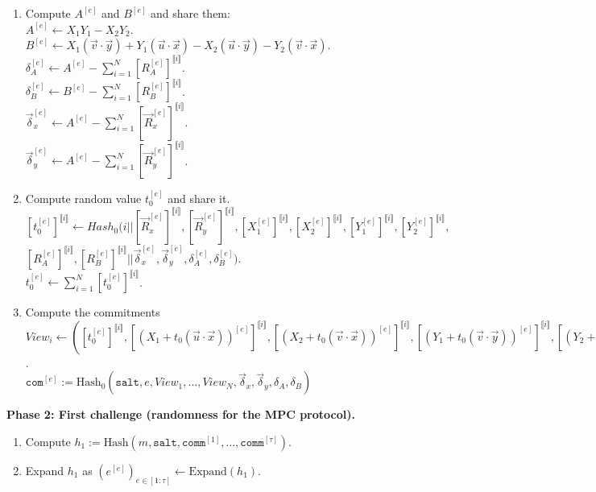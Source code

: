 \documentclass[english]{article}
\newcommand{\lir}{\llbracket i \rrbracket}
\begin{document}
\begin{tcolorbox}[title=Protocol 15: Signing Algorithm, breakable, enhanced, colback=white, colframe=black]
\begin{enumerate}[label=\arabic*.]
				\item Compute $A^{[e]}$ and $B^{[e]}$ and share them: \\
				\quad $A^{[e]} \leftarrow X_1Y_1 - X_2Y_2$. \\
				\quad $B^{[e]} \leftarrow X_1(\vec{v} \cdot \vec{y}) + Y_1(\vec{u} \cdot \vec{x}) - X_2(\vec{u} \cdot \vec{y}) - Y_2(\vec{v} \cdot \vec{x})$. \\
				\quad $\delta_A^{[e]} \leftarrow A^{[e]} - \sum_{i=1}^{N} [R_A^{[e]}]^{\lir}$. \\
				\quad $\delta_B^{[e]} \leftarrow B^{[e]} - \sum_{i=1}^{N} [R_B^{[e]}]^{\lir}$. \\
				\quad $\vec{\delta}_x^{[e]} \leftarrow A^{[e]} - \sum_{i=1}^{N} [\vec{R}_x^{[e]}]^{\lir}$. \\
				\quad $\vec{\delta}_y^{[e]} \leftarrow A^{[e]} - \sum_{i=1}^{N} [\vec{R}_y^{[e]}]^{\lir}$.
				
				\item Compute random value $t_0^{[e]}$ and share it. \\
				\quad $[t_0^{[e]}]^{\lir} \leftarrow Hash_0(i || [\vec{R}_x^{[e]}]^{\lir}, [\vec{R}_y^{[e]}]^{\lir}, [X_1^{[e]}]^{\lir}, [X_2^{[e]}]^{\lir}, [Y_1^{[e]}]^{\lir}, [Y_2^{[e]}]^{\lir},$ \\ $[R_A^{[e]}]^{\lir}, [R_B^{[e]}]^{\lir} || \vec{\delta}_x^{[e]}, \vec{\delta}_y^{[e]}, \delta_A^{[e]}, \delta_B^{[e]})$. \\
				\quad $t_0^{[e]} \leftarrow \sum_{i=1}^{N} [t_0^{[e]}]^{\lir}$.
				
				
				\item Compute the commitments \\
				\quad $View_i \leftarrow (
				[t_0^{[e]}]^{\lir},
				[(X_1 + t_0(\vec{u} \cdot \vec{x}))^{[e]}]^{\lir},
				[(X_2 + t_0(\vec{v} \cdot \vec{x}))^{[e]}]^{\lir},
				[(Y_1 + t_0(\vec{v} \cdot \vec{y}))^{[e]}]^{\lir},
				[(Y_2 + t_0(\vec{u} \cdot \vec{y}))^{[e]}]^{\lir},
				[(A + t_0 B)^{[e]}]^{\lir}
				)$. \\
				\quad $\texttt{com}^{[e]} := \text{Hash}_0(\texttt{salt}, e, View_1, \dots, View_N, \vec{\delta}_x, \vec{\delta}_y, \delta_A, \delta_B)$
			\end{enumerate}
			
			\vspace{0.5em}
			\textbf{Phase 2: First challenge (randomness for the MPC protocol).}
			\begin{enumerate}[label=\arabic*.]
				\item Compute $h_1 := \text{Hash}(m, \texttt{salt}, \texttt{comm}^{[1]}, \dots, \texttt{comm}^{[\tau]})$.
				\item Expand $h_1$ as $(e^{[e]})_{e \in [1:\tau]} \leftarrow \text{Expand}(h_1)$.
			\end{enumerate}
			

\end{tcolorbox}
\end{document}
